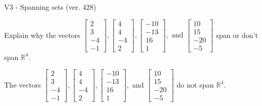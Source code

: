 \begin{exercise}
  \begin{exerciseTitle}V3 - Spanning sets (ver. 428)\end{exerciseTitle}
  \begin{exerciseStatement}
    Explain why the vectors \(\left[\begin{array}{r}
2 \\
3 \\
-4 \\
-1
\end{array}\right] , \left[\begin{array}{r}
4 \\
4 \\
-4 \\
2
\end{array}\right] , \left[\begin{array}{r}
-10 \\
-13 \\
16 \\
1
\end{array}\right] , \text{ and } \left[\begin{array}{r}
10 \\
15 \\
-20 \\
-5
\end{array}\right]\) span or don't span \(\mathbb{R}^4\). 
	


  \end{exerciseStatement}
  \begin{exerciseAnswer}
   The vectors \(\left[\begin{array}{r}
2 \\
3 \\
-4 \\
-1
\end{array}\right] , \left[\begin{array}{r}
4 \\
4 \\
-4 \\
2
\end{array}\right] , \left[\begin{array}{r}
-10 \\
-13 \\
16 \\
1
\end{array}\right] , \text{ and } \left[\begin{array}{r}
10 \\
15 \\
-20 \\
-5
\end{array}\right]\) 
  	 do not  
	span \(\mathbb{R}^4\).
  


  \end{exerciseAnswer}
\end{exercise}